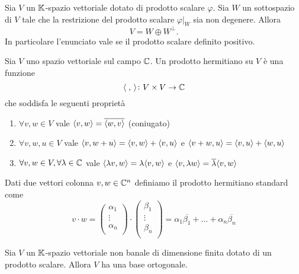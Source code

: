 \begin{thm}
	Sia $ V $ un $ \mathbb{K} $-spazio vettoriale dotato di prodotto scalare $ \varphi $. Sia $ W $ un sottospazio di $ V $ tale che la restrizione del prodotto scalare $ \varphi\lvert_{W} $ sia non degenere. Allora \[V = W \oplus W^{\perp}.\] In particolare l'enunciato vale se il prodotto scalare definito positivo. 
\end{thm}

\begin{definition}
	Sia $ V $ uno spazio vettoriale sul campo $ \mathbb{C} $. Un prodotto hermitiano su $ V $ è una funzione \[\langle \;, \, \rangle \colon V \times V \to \mathbb{C} \] che soddisfa le seguenti proprietà
	\begin{enumerate}[label=(\roman*)]
		\item $ \forall v,w \in V $ vale $ \langle v, w \rangle = \overline{\langle w, v \rangle} $ (coniugato)
		\item $ \forall v, w, u \in V $ vale $ \langle v, w + u \rangle = \langle v, w \rangle + \langle v, u \rangle $ e $ \langle v + w, u \rangle = \langle v, u \rangle + \langle w, u \rangle $
		\item $ \forall v, w \in V, \forall \lambda \in \mathbb{C} $ vale $ \langle \lambda v, w \rangle = \lambda \langle v, w \rangle $ e $ \langle v, \lambda w \rangle = \overline{\lambda} \langle v, w \rangle $
	\end{enumerate}	
\end{definition}

\begin{definition}
	Dati due vettori colonna $ v, w \in \mathbb{C}^n $ definiamo il prodotto hermitiano standard come 
	\[v \cdot w = 
	\begin{pmatrix}
	\alpha_1 \\
	\vdots \\
	\alpha_n \\ 
	\end{pmatrix}
	\cdot 
	\begin{pmatrix}
	\beta_1 \\
	\vdots \\
	\beta_n \\ 
	\end{pmatrix}
	= \alpha_1 \overline{\beta_1} + \ldots + \alpha_n \overline{\beta_n}\]
\end{definition}

\begin{thm} \label{thm:base_ortogonale}
	Sia $ V $ un $ \mathbb{K} $-spazio vettoriale non banale di dimensione finita dotato di un prodotto scalare. Allora $ V $ ha una base ortogonale. 
\end{thm}

